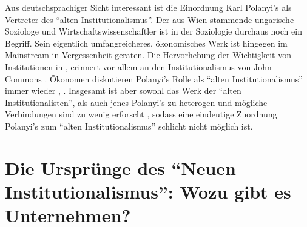Aus deutschsprachiger Sicht interessant ist die Einordnung Karl Polanyi's als Vertreter des "`alten Institutionalismus"'. Der aus Wien stammende ungarische Soziologe und Wirtschaftswissenschaftler ist in der Soziologie durchaus noch ein Begriff. Sein eigentlich umfangreicheres, ökonomisches Werk ist hingegen im Mainstream in Vergessenheit geraten. Die Hervorhebung der Wichtigkeit von Institutionen in \textcite{Polanyi1944}, erinnert vor allem an den Institutionalismus von John Commons \parencite{Maucourant1995}. Ökonomen diskutieren Polanyi's Rolle als "`alten Institutionalismus"' immer wieder \parencite[S. 183]{Hodgson1998}, \parencite{Cangiani2011}. Insgesamt ist aber sowohl das Werk der "`alten Institutionalisten"', als auch jenes Polanyi's zu heterogen und mögliche Verbindungen sind zu wenig erforscht \parencite{Frerichs2024}, sodass eine eindeutige Zuordnung Polanyi's zum "`alten Institutionalismus"' schlicht nicht möglich ist.


\section{Die Ursprünge des "`Neuen Institutionalismus"': Wozu gibt es Unternehmen?} \label{sec: Neue Inst}

